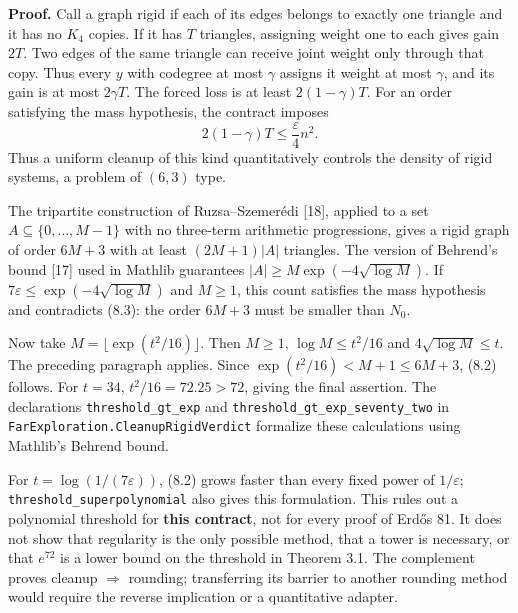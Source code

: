 \documentclass[english,11pt,a4paper]{article}
\begin{document}
\textbf{Proof.} Call a graph rigid if each of its edges belongs to exactly one triangle and it has no \(K_4\) copies. If it has \(T\) triangles, assigning weight one to each gives gain \(2T\). Two edges of the same triangle can receive joint weight only through that copy. Thus every \(y\) with codegree at most \(\gamma\) assigns it weight at most \(\gamma\), and its gain is at most \(2\gamma T\). The forced loss is at least \(2(1-\gamma)T\). For an order satisfying the mass hypothesis, the contract imposes \[
2(1-\gamma)T\le\frac{\varepsilon}{4}n^2.
\tag{8.3}
\] Thus a uniform cleanup of this kind quantitatively controls the density of rigid systems, a problem of \((6,3)\) type.

The tripartite construction of Ruzsa--Szemerédi {[}18{]}, applied to a set \(A\subseteq\{0,\ldots,M-1\}\) with no three-term arithmetic progressions, gives a rigid graph of order \(6M+3\) with at least \((2M+1)|A|\) triangles. The version of Behrend's bound {[}17{]} used in Mathlib guarantees \(|A|\ge M\exp(-4\sqrt{\log M})\). If \(7\varepsilon\le\exp(-4\sqrt{\log M})\) and \(M\ge1\), this count satisfies the mass hypothesis and contradicts (8.3): the order \(6M+3\) must be smaller than \(N_0\).

Now take \(M=\lfloor\exp(t^2/16)\rfloor\). Then \(M\ge1\), \(\log M\le t^2/16\) and \(4\sqrt{\log M}\le t\). The preceding paragraph applies. Since \(\exp(t^2/16)<M+1\le6M+3\), (8.2) follows. For \(t=34\), \(t^2/16=72.25>72\), giving the final assertion. The declarations \nolinkurl{threshold_gt_exp} and \nolinkurl{threshold_gt_exp_seventy_two} in \nolinkurl{FarExploration.CleanupRigidVerdict} formalize these calculations using Mathlib's Behrend bound.

For \(t=\log(1/(7\varepsilon))\), (8.2) grows faster than every fixed power of \(1/\varepsilon\); \nolinkurl{threshold_superpolynomial} also gives this formulation. This rules out a polynomial threshold for \textbf{this contract}, not for every proof of Erdős 81. It does not show that regularity is the only possible method, that a tower is necessary, or that \(e^{72}\) is a lower bound on the threshold in Theorem 3.1. The complement proves cleanup \(\Rightarrow\) rounding; transferring its barrier to another rounding method would require the reverse implication or a quantitative adapter.
\end{document}
